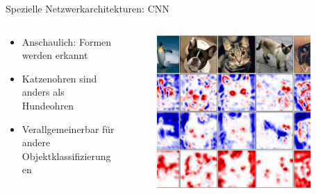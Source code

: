 \documentclass[aspectratio=1610, xcolor=dvipsnames, 9pt]{beamer}
\begin{document}
      \begin{frame}{Spezielle Netzwerkarchitekturen: CNN}
        \begin{columns}
          \begin{column}{0.5\textwidth}
            \begin{itemize}
              \item Anschaulich: Formen werden erkannt \newline 
              \item Katzenohren sind anders als Hundeohren \newline 
              \item Verallgemeinerbar für andere Objektklassifizierungen \newline
            \end{itemize}
          \end{column}
           \begin{column}{0.5\textwidth}
             \begin{figure}
               \centering
                           \includegraphics[width=0.9\textwidth]{images/featuremaps.jpg}
               \end{figure}

           \end{column}
        \end{columns}
      \end{frame}
\end{document}

